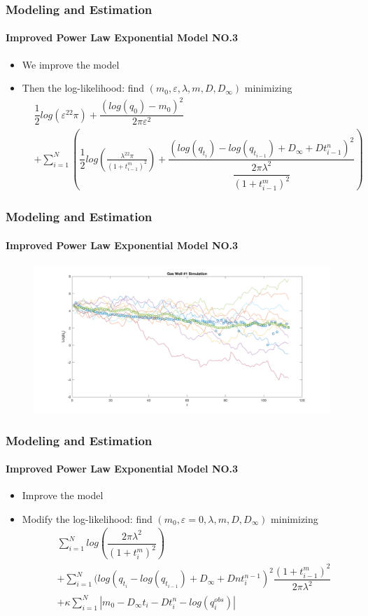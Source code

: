\documentclass[11pt]{beamer}
\begin{document}
				
	\begin{frame}
		\frametitle{Modeling and Estimation}
		\framesubtitle{Improved Power Law Exponential Model NO.3}
		\justifying
\begin{itemize}
		\item We improve the model
		\item Then the log-likelihood: find $(m_0,\varepsilon,\lambda,m,D,D_{\infty})$ minimizing
		\begin{eqnarray*}
		&\dfrac{1}{2}log(\varepsilon^22\pi)+\dfrac{(log(q_0)-m_0)^2}{2 \pi \varepsilon^2} \\
		&
		+\sum_{i=1}^N\left(\dfrac{1}{2}log(\frac{\lambda^22\pi}{(1+t_{i-1}^m)^2})+\dfrac{(log(q_{t_i})-log(q_{t_{i-1}})+D_\infty+Dt_{i-1}^n)^2}{\dfrac{2\pi\lambda^2}{(1+t^m_{i-1})^2}}\right)
		\end{eqnarray*}
		\end{itemize}		
	\end{frame}	
	
	
	\begin{frame}
		\frametitle{Modeling and Estimation}
		\framesubtitle{Improved Power Law Exponential Model NO.3}
		\justifying
	\begin{figure}
\begin{center}
\includegraphics[width=1.1\textwidth  ]{intmodel} 

\end{center}
\end{figure}				
	\end{frame}	

	
	\begin{frame}
		\frametitle{Modeling and Estimation}
		\framesubtitle{Improved Power Law Exponential Model NO.3}
		\justifying
\begin{itemize}
		\item Improve the model
		\item Modify the log-likelihood: find $(m_0,\varepsilon=0,\lambda,m,D,D_{\infty})$ minimizing
		\begin{eqnarray*}
		& \sum_{i=1}^Nlog(\dfrac{2\pi\lambda^2}{(1+t_i^m)^2})\\
		&+\sum_{i=1}^N(log(q_{t_i}-log(q_{t_{i-1}})+D_\infty+Dnt_i^{n-1})^2\dfrac{(1+t^m_{i-1})^2}{2\pi\lambda^2}\\
		&+\kappa\sum_{i=1}^N|m_0-D_\infty t_i-Dt_i^n-log(q_i^{obs})|
		\end{eqnarray*}
		\end{itemize}	
			\end{frame}	
	
\end{document}

